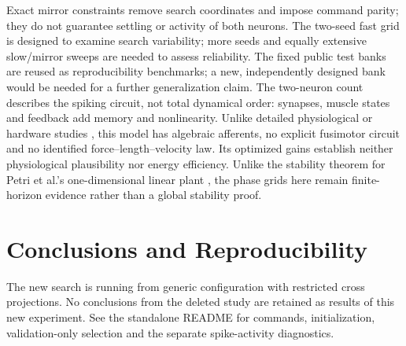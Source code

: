 \documentclass{styles/svproc}
\begin{document}
Exact mirror constraints remove search coordinates and impose command parity; they do not guarantee settling or activity of both neurons. The two-seed fast grid is designed to examine search variability; more seeds and equally extensive slow/mirror sweeps are needed to assess reliability. The fixed public test banks are reused as reproducibility benchmarks; a new, independently designed bank would be needed for a further generalization claim. The two-neuron count describes the spiking circuit, not total dynamical order: synapses, muscle states and feedback add memory and nonlinearity. Unlike detailed physiological or hardware studies \cite{elias2014,niu2017,jalaleddini2017}, this model has algebraic afferents, no explicit fusimotor circuit and no identified force--length--velocity law. Its optimized gains establish neither physiological plausibility nor energy efficiency. Unlike the stability theorem for Petri et al.'s one-dimensional linear plant \cite{petri2026}, the phase grids here remain finite-horizon evidence rather than a global stability proof.

\section{Conclusions and Reproducibility}
The new search is running from generic configuration with restricted cross projections. No conclusions from the deleted study are retained as results of this new experiment. See the standalone README for commands, initialization, validation-only selection and the separate spike-activity diagnostics.

\clearpage



\end{document}
